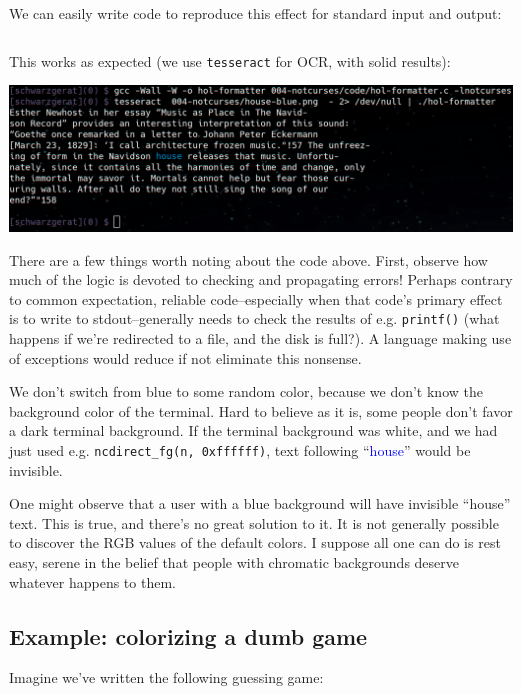 \documentclass[letterpaper,10pt]{article}
\begin{document}
We can easily write code to reproduce this effect for standard input and output:

\begin{listing}[ht]
\inputminted[fontsize=\scriptsize]{C}{code/hol-formatter.c}
\end{listing}

This works as expected (we use \texttt{tesseract} for OCR, with solid results):

\begin{center}
\includegraphics[width=.75\linewidth]{hol-formatted.png}
\end{center}

There are a few things worth noting about the code above. First, observe how
much of the logic is devoted to checking and propagating errors! Perhaps
contrary to common expectation, reliable code--especially when that code's
primary effect is to write to stdout--generally needs to check the results of
e.g. \texttt{printf()} (what happens if we're redirected to a file, and
the disk is full?). A language making use of exceptions would reduce if not
eliminate this nonsense.

We don't switch from blue to some random color, because we don't know the
background color of the terminal. Hard to believe as it is, some people don't
favor a dark terminal background. If the terminal background was white, and we
had just used e.g. \texttt{ncdirect\_fg(n, 0xffffff)}, text following
``\textcolor{blue}{house}'' would be invisible.

One might observe that a user with a blue background will have invisible ``house'' text.
This is true, and there's no great solution to it. It is not generally possible to
discover the RGB values of the default colors. I suppose all one can do is rest easy,
serene in the belief that people with chromatic backgrounds deserve whatever happens to them.

\subsection{Example: colorizing a dumb game}

Imagine we've written the following guessing game:
\end{document}
